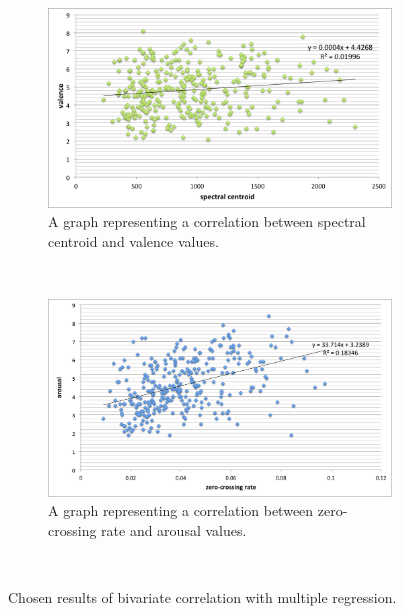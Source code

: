 \begin{figure}
        \centering
        \begin{subfigure}[b]{0.48\textwidth}
                \includegraphics[width=\textwidth]{Figures/spectralcentroid-valence}
                \caption{A graph representing a correlation between spectral centroid and valence values.}
                \label{fig:is }
        \end{subfigure}%
        ~ %
        \begin{subfigure}[b]{0.48\textwidth}
                \includegraphics[width=\textwidth]{Figures/zerocrossing-arousal}
                \caption{A graph representing a correlation between zero-crossing rate and arousal values.}
                \label{fig:simtunes}
        \end{subfigure}
          \caption{Chosen results of bivariate correlation with multiple regression.}
        ~ %
\end{figure}



